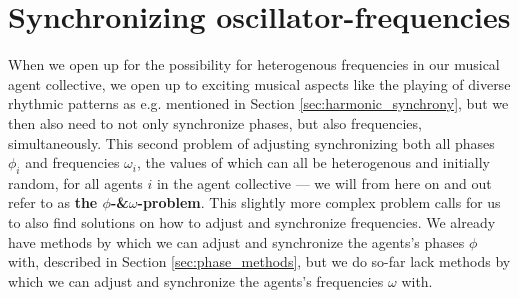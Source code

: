 	
	
	
	










	

\section{Synchronizing oscillator-frequencies}
\label{sec:frequency_methods}
	When we open up for the possibility for heterogenous frequencies in our musical agent collective, we open up to exciting musical aspects like the playing of diverse rhythmic patterns as e.g. mentioned in Section \ref{sec:harmonic_synchrony}, but we then also need to not only synchronize phases, but also frequencies, simultaneously. This second problem of adjusting synchronizing both all phases $\phi_i$ and frequencies $\omega_i$, the values of which can all be heterogenous and initially random, for all agents $i$ in the agent collective — we will from here on and out refer to as \textbf{the $\phi$-\&$\omega$-problem}. This slightly more complex problem calls for us to also find solutions on how to adjust and synchronize frequencies. We already have methods by which we can adjust and synchronize the agents's phases $\phi$ with, described in Section \ref{sec:phase_methods}, but we do so-far lack methods by which we can adjust and synchronize the agents's frequencies $\omega$ with.
	
